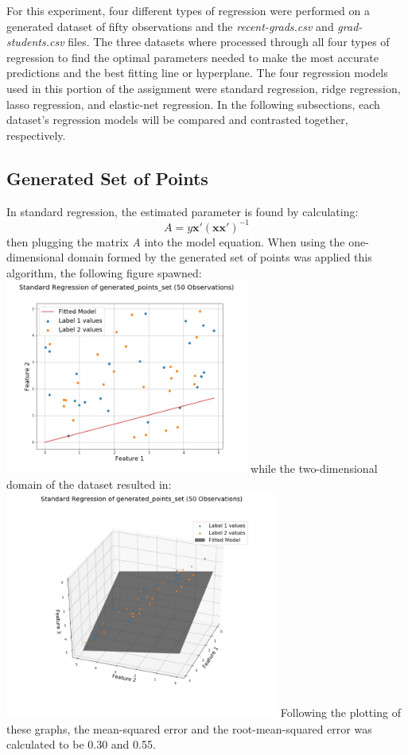 \documentclass[a4paper,12pt]{IEEEtran}
\begin{document}
For this experiment, four different types of regression were performed on a generated dataset of fifty observations and the \textit{recent-grads.csv} and \textit{grad-students.csv} files. The three datasets where processed through all four types of regression to find the optimal parameters needed to make the most accurate predictions and the best fitting line or hyperplane. The four regression models used in this portion of the assignment were standard regression, ridge regression, lasso regression, and elastic-net regression. In the following subsections, each dataset's regression models will be compared and contrasted together, respectively.

\subsection{Generated Set of Points}
\label{gen_set}
In standard regression, the estimated parameter is found by calculating: \[\textit{A} = \textit{y}\textbf{x}'(\textbf{x}\textbf{x}')^{-1}\] then plugging the matrix \textit{A} into the model equation. When using the one-dimensional domain formed by the generated set of points was applied this algorithm, the following figure spawned: \includegraphics[width=8cm]{std_reg_1d_generated_points_set} while the two-dimensional domain of the dataset resulted in: \includegraphics[width=9cm]{std_reg_2d_generated_points_set} Following the plotting of these graphs, the mean-squared error and the root-mean-squared error was calculated to be 0.30 and 0.55.
\end{document}
